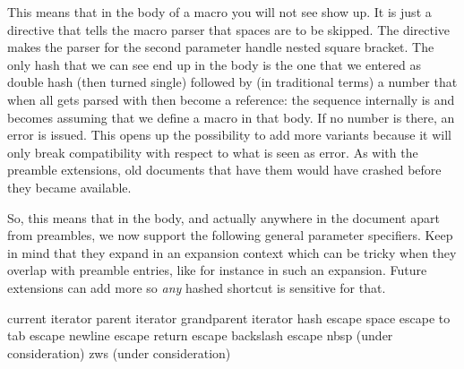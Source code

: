 This means that in the body of a macro you will not see \type {#*} show up. It is
just a directive that tells the macro parser that spaces are to be skipped. The
 directive makes the parser for the second parameter handle nested
square bracket. The only hash that we can see end up in the body is the one that
we entered as double hash (then turned single) followed by (in traditional terms)
a number that when all gets parsed with then become a reference: the sequence
 internally is  and becomes  assuming that we define a macro in that body. If no number is there, an error
is issued. This opens up the possibility to add more variants because it will
only break compatibility with respect to what is seen as error. As with the
preamble extensions, old documents that have them would have crashed before they
became available.

So, this means that in the body, and actually anywhere in the document apart from
preambles, we now support the following general parameter specifiers. Keep in
mind that they expand in an expansion context which can be tricky when they
overlap with preamble entries, like for instance  in such an expansion.
Future extensions can add more so {\em any} hashed shortcut is sensitive for
that.

\starttabulate[|l|||]
\NC {} \NC current iterator     \NC \type {\currentloopiterator}    \NC \NR
\NC {} \NC parent iterator      \NC {} \NC \NR
\NC {} \NC grandparent iterator \NC {} \NC \NR
\TB
\NC {} \NC hash escape          \NC \type {#}  \NC \NR
\NC {} \NC space escape         \NC {} to  \NC \NR
\NC {} \NC tab escape           \NC \type {\t} \NC \NR
\NC {} \NC newline escape       \NC \type {\n} \NC \NR
\NC {} \NC return escape        \NC \type {\r} \NC \NR
\NC {} \NC backslash escape     \NC \tex  {}   \NC \NR
\TB
\NC {} \NC nbsp \NC {} (under consideration) \NC \NR
\NC {} \NC zws  \NC {} (under consideration) \NC \NR
\stoptabulate

